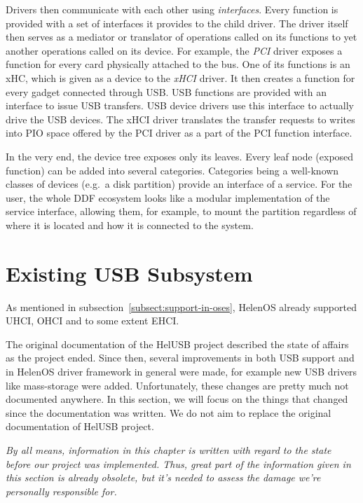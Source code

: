 Drivers then communicate with each other using \emph{interfaces}. Every
function is provided with a set of interfaces it provides to the child driver. The
driver itself then serves as a mediator or translator of operations called on
its functions to yet another operations called on its device. For example, the
\emph{PCI} driver exposes a function for every card physically attached to the
bus. One of its functions is an xHC, which is given as a device to the
\emph{xHCI} driver. It then creates a function for every gadget connected
through USB. USB functions are provided with an interface to issue USB
transfers. USB device drivers use this interface to actually drive the USB
devices. The xHCI driver translates the transfer requests to writes into PIO
space offered by the PCI driver as a part of the PCI function interface.

In the very end, the device tree exposes only its leaves. Every leaf node
(exposed function) can be added into several categories. Categories being
a well-known classes of devices (e.g.\ a disk partition) provide an interface
of a service. For the user, the whole DDF ecosystem looks like a modular
implementation of the service interface, allowing them, for example, to mount
the partition regardless of where it is located and how it is connected to the
system.



\section{Existing USB Subsystem}

As mentioned in subsection~\ref{subsect:support-in-oses}, HelenOS already supported
UHCI, OHCI and to some extent EHCI.

The original documentation of the HelUSB project described the state of affairs
as the project ended. Since then, several improvements in both USB support
and in HelenOS driver framework in general were made, for example new USB
drivers like mass-storage were added. Unfortunately, these changes are pretty
much not documented anywhere. In this section, we will focus on the things that changed since the
documentation was written. We do not aim to replace the original documentation
of HelUSB project.

\vspace{1.5em}
\textsl{By all means, information in this chapter is written with
regard to the state before \emph{our} project was implemented. Thus, great part
of the information given in this section is already obsolete, but it's needed to
assess the damage we're personally responsible for.}
\vspace{1.5em}

